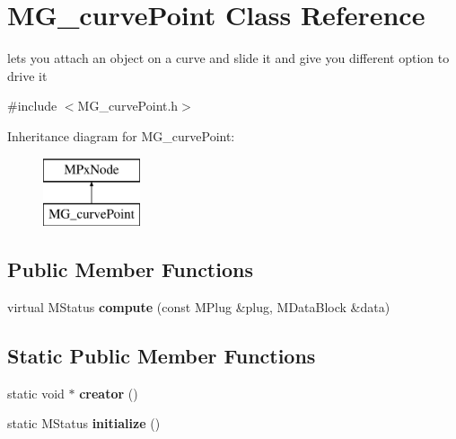 \hypertarget{class_m_g__curve_point}{\section{M\-G\-\_\-curve\-Point Class Reference}
\label{class_m_g__curve_point}
}


lets you attach an object on a curve and slide it and give you different option to drive it  




{\ttfamily \#include $<$M\-G\-\_\-curve\-Point.\-h$>$}

Inheritance diagram for M\-G\-\_\-curve\-Point\-:\begin{figure}[H]
\begin{center}
\leavevmode
\includegraphics[height=2.000000cm]{class_m_g__curve_point}
\end{center}
\end{figure}
\subsection*{Public Member Functions}
\begin{DoxyCompactItemize}
\item 
\hypertarget{class_m_g__curve_point_a6f5b68e1d34f27a061ccb97a8db61ba9}{virtual M\-Status {\bfseries compute} (const M\-Plug \&plug, M\-Data\-Block \&data)}\label{class_m_g__curve_point_a6f5b68e1d34f27a061ccb97a8db61ba9}

\end{DoxyCompactItemize}
\subsection*{Static Public Member Functions}
\begin{DoxyCompactItemize}
\item 
\hypertarget{class_m_g__curve_point_a5f3b967210573cb7d07db95e56086eb7}{static void $\ast$ {\bfseries creator} ()}\label{class_m_g__curve_point_a5f3b967210573cb7d07db95e56086eb7}

\item 
\hypertarget{class_m_g__curve_point_a322ad2c6bbfab31b757509c473210cb8}{static M\-Status {\bfseries initialize} ()}\label{class_m_g__curve_point_a322ad2c6bbfab31b757509c473210cb8}

\end{DoxyCompactItemize}

